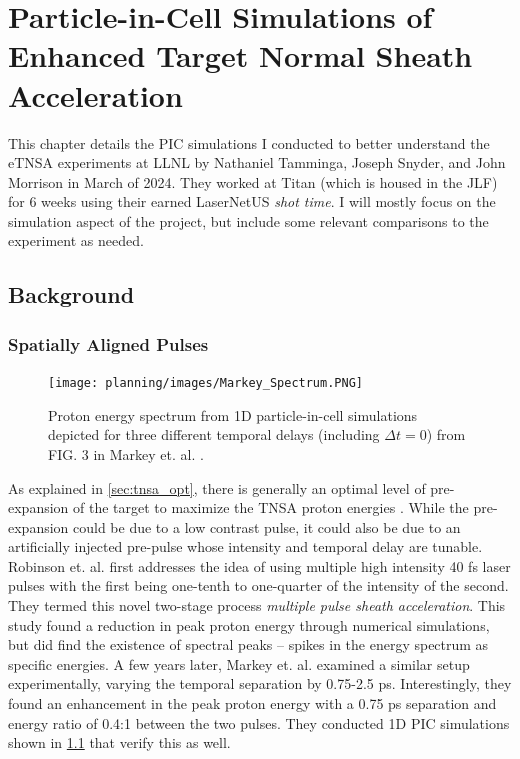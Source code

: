 \chapter{Particle-in-Cell Simulations of Enhanced Target Normal Sheath Acceleration} \label{ch:4}

This chapter details the \gls{PIC} simulations I conducted to better understand the \gls{eTNSA} experiments at \gls{LLNL} by Nathaniel Tamminga, Joseph Snyder, and John Morrison in March of 2024. They worked at Titan (which is housed in the \gls{JLF}) for 6 weeks using their earned LaserNetUS \emph{shot time}. I will mostly focus on the simulation aspect of the project, but include some relevant comparisons to the experiment as needed. 

\section{Background} \label{sec:etnsa_background}

\subsection{Spatially Aligned Pulses} \label{sec:spatialalign}

\begin{figure}
	\centering 
	\texttt{[image: planning/images/Markey\_Spectrum.PNG]}
	\caption{Proton energy spectrum from 1D particle-in-cell simulations depicted for three different temporal delays (including $\Delta t = 0$) from FIG. 3 in Markey et. al. \cite{Markey_2010_PRL}.}
	\label{fig:markey_spectrum}
\end{figure}

As explained in \cref{sec:tnsa_opt}, there is generally an optimal level of pre-expansion of the target to maximize the \gls{TNSA} proton energies \cite{McKenna_2008_LaPB,Fuchs_2007_PRL}. While the pre-expansion could be due to a low contrast pulse, it could also be due to an artificially injected pre-pulse whose intensity and temporal delay are tunable. Robinson et. al. \cite{Robinson_2007_PPCF} first addresses the idea of using multiple high intensity 40 fs laser pulses with the first being one-tenth to one-quarter of the intensity of the second. They termed this novel two-stage process \emph{multiple pulse sheath acceleration}. This study found a reduction in peak proton energy through numerical simulations, but did find the existence of spectral peaks -- spikes in the energy spectrum as specific energies. A few years later, Markey et. al. \cite{Markey_2010_PRL} examined a similar setup experimentally, varying the temporal separation by 0.75-2.5 ps. Interestingly, they found an enhancement in the peak proton energy with a 0.75 ps separation and energy ratio of 0.4:1 between the two pulses. They conducted 1D PIC simulations shown in \cref{fig:markey_spectrum} that verify this as well.

